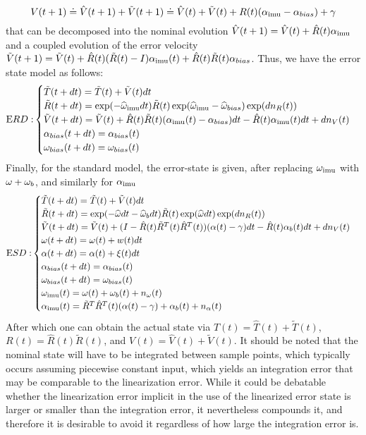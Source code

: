 {\begin{equation}
V(t+1) \doteq \hat V(t+1) + \tilde V(t+1) \doteq \hat V(t) + \tilde V(t) + R(t)(\alpha\imu  - \alpha_{bias}) + \gamma %
\end{equation}
that can be decomposed into the nominal evolution $\hat V(t+1) = \hat V(t) + \hat R(t)\alpha_\mathrm{imu} $ and a coupled evolution of the error velocity $\tilde V(t+1) = \tilde V(t) +\hat R(t)(\tilde R(t) -I)\alpha_\mathrm{imu} (t) + \hat R(t)\tilde R(t) \alpha_{bias}$. Thus, we have the error state model as follows:
\begin{equation}
{\mathrm ERD:} 
\begin{cases}
\tilde T(t+dt) = \tilde T(t) + \tilde V(t)dt\\
\tilde R(t+dt) = \exp(-\widehat {\omega}_\mathrm{imu} dt)\tilde R(t) \exp(\widehat {\omega}_\mathrm{imu}  - \widehat {\omega}_{bias})\exp(dn_R(t))\\
\tilde V(t+dt) = \tilde V(t) +\hat R(t)\tilde R(t)(\alpha_\mathrm{imu} (t) - \alpha_{bias})dt - \hat R(t)\alpha_\mathrm{imu} (t)dt + dn_V(t)\\
\alpha_{bias}(t+dt)  = \alpha_{bias}(t) \\
\omega_{bias}(t+dt) = \omega_{bias}(t) \\
\end{cases}
\end{equation}
Finally, for the standard model, the error-state is given, after replacing $\omega_\mathrm{imu} $ with $\omega + \omega_b$, and similarly for $\alpha_\mathrm{imu} $
\begin{equation}
{\mathrm ESD:}
\begin{cases}
\tilde T(t+dt) = \tilde T(t) + \tilde V(t)dt\\
\tilde R(t+dt) = \exp(-\widehat {\omega} dt -\widehat {\omega}_b dt)\tilde R(t) \exp(\widehat {\omega} dt)\exp(dn_R(t))\\
\tilde V(t+dt) = \tilde V(t) + (I - \hat R(t){\tilde R}^T(t) {\hat R}^T(t)) (\alpha(t) - \gamma)dt - \hat R(t)\alpha_{b}(t)dt + dn_V(t)\\
\omega(t+dt) =  \omega(t) + w(t)dt \\
\alpha(t+dt) = \alpha(t) + \xi(t)dt \\
\alpha_{bias}(t+dt)  = \alpha_{bias}(t) \\
\omega_{bias}(t+dt) = \omega_{bias}(t) \\
\omega_\mathrm{imu} (t) = \omega(t) + \omega_b(t) + n_{\omega}(t) \\ 
\alpha_\mathrm{imu} (t) = {\tilde R}^T {\hat R}^T(t) (\alpha(t)- \gamma) + \alpha_b(t) + n_{\alpha}(t) 
\end{cases}
\end{equation}
After which one can obtain the actual state via $T(t) = \hat T(t) + \tilde T(t)$, $R(t) = \hat R(t) \tilde R(t)$, and $V(t) = \hat V(t) + \tilde V(t)$. 
%
It should be noted that the nominal state will have to be integrated between sample points, which typically occurs assuming piecewise constant input, which yields an integration error that may be comparable to the linearization error. While it could be debatable whether the linearization error implicit in the use of the linearized error state is larger or smaller than the integration error, it nevertheless compounds it, and therefore it is desirable to avoid it regardless of how large the integration error is.
%
}
